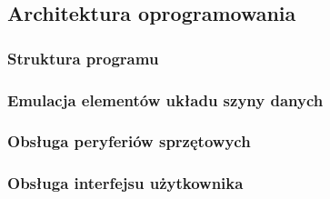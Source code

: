 \documentclass[../main.tex]{subfiles}
\begin{document}
\subsection{Architektura oprogramowania}

    \subsubsection{Struktura programu}

    \subsubsection{Emulacja elementów układu szyny danych}

    \subsubsection{Obsługa peryferiów sprzętowych}

    \subsubsection{Obsługa interfejsu użytkownika}
\end{document}
